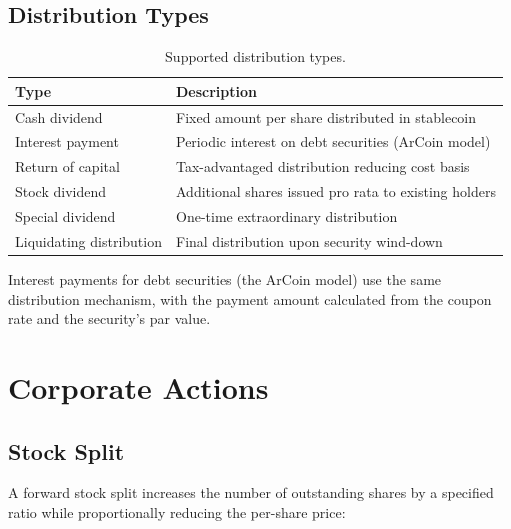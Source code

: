 \documentclass[11pt,a4paper]{article}
\begin{document}
\subsection{Distribution Types}

\begin{table}[H]
\centering
\caption{Supported distribution types.}
\label{tab:distributions}
\begin{tabular}{lp{7.5cm}}
\toprule
\textbf{Type} & \textbf{Description} \\
\midrule
Cash dividend & Fixed amount per share distributed in stablecoin \\
Interest payment & Periodic interest on debt securities (ArCoin model) \\
Return of capital & Tax-advantaged distribution reducing cost basis \\
Stock dividend & Additional shares issued pro rata to existing holders \\
Special dividend & One-time extraordinary distribution \\
Liquidating distribution & Final distribution upon security wind-down \\
\bottomrule
\end{tabular}
\end{table}

Interest payments for debt securities (the ArCoin model) use the same distribution mechanism, with the payment amount calculated from the coupon rate and the security's par value.

\section{Corporate Actions}\label{sec:corporate}

\subsection{Stock Split}

A forward stock split increases the number of outstanding shares by a specified ratio while proportionally reducing the per-share price:
\end{document}
